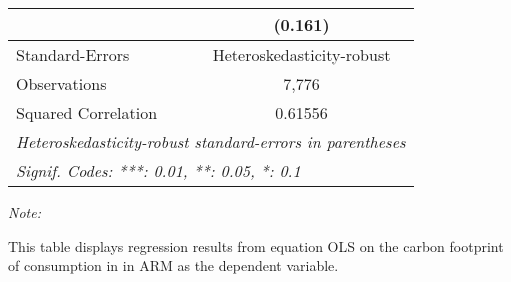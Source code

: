 \begin{table}[htbp!]
\begin{adjustbox}{width = 1\textwidth, max height = 0.95\textheight, center}
\begin{threeparttable}[b]
\begin{tabular}{lc}
                                & (0.161)\\   
            \midrule 
            Standard-Errors     & Heteroskedasticity-robust \\   
            Observations        & 7,776\\  
            Squared Correlation & 0.61556\\  
            \midrule \midrule
            \multicolumn{2}{l}{\emph{Heteroskedasticity-robust standard-errors in parentheses}}\\
            \multicolumn{2}{l}{\emph{Signif. Codes: ***: 0.01, **: 0.05, *: 0.1}}\\
         \end{tabular}
         
         \begin{tablenotes}\item \medskip \textit{Note:}
            \item This table displays regression results from equation OLS on the carbon footprint of consumption in  in ARM as the dependent variable.  
         \end{tablenotes}
      \end{threeparttable}
   \end{adjustbox}
\end{table}


